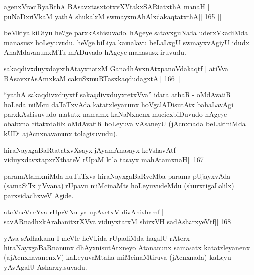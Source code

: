 
\begin{shl}
agenxVraciRyaRthA BAsavxtasxtotxvXVtakxSARtatxthA manaH |
puNaDxriVkaM yathA shukalxM swmayxmAhAlxdakaqtatxthA\hfill || 165 ||
\end{shl}

\begin{artha}
beMkiya kiDiyu heVge parxkAshisuvado, hAgeye satavxguNada uderxVkadiMda manasusx hoLeyuvudu. heVge biLiya kamalavu beLaLxgU swmayxvAgiyU idudx AnaMdavanunxMTu mADuvado hAgeye manasusx iruvudu.
\end{artha}

\begin{shl}
sakaqdivxduyxdayxthA\s tayxnatxM GanadhAvxnAtxpanoVdakaqtf |
atiVva BAsavxrA\s sAmxkaM cakuSxmuRTasxkaqdudagxtA\hfill || 166 ||
\end{shl}

\begin{artha}
``yathA sakaqdivxduyxtf sakaqdivxduyxtetxVva'' idara athaR - oMdAvatiR hoLeda miMcu daTaTxvAda katatxleyanunx hoVgalADisutAtx bahaLavAgi parxkAshisuvudo matutx namamx kaNaNxnenx mucicxbiDuvudo hAgeye obabxna citatxdalilx oMdAvatiR hoLeyuva vAsaneyU (jAcnxnada beLakiniMda kUDi ajAcnxnavanunx tolagisuvudu).
\end{artha}


\begin{shl}
hiraNayxgaBaRtatatxvXsayx jAyamAnasayx keVshavAtf |
viduyxdavxtapxrXthateV rUpaM kila tasayx mahAtamxnaH\hfill || 167 ||
\end{shl}

\begin{artha}
paramAtamxniMda huTuTxva hiraNayxgaBaRveMba parama pUjayxvAda (samaSiTx jiVvana) rUpavu miMcinaMte hoLeyuvudeMdu (shurxtigaLalilx) parxsidadhxveV Agide.
\end{artha}


\begin{shl}
atoV\s neVneYva rUpeVNa ya upAsetxV divAnishamf |
savARnadhxkArahanitxrXVva viduyxtatxM shirxVH sadA\s\s sharxyeVtf\hfill || 168 ||
\end{shl}

\begin{artha}
yAva sAdhakanu I meVle heVLida rUpadiMda hagalU rAterx hiraNayxgaBaRnanunx dhAyxnisutAtxneyo Atananunx samasatx katatxleyanenx (ajAcnxnavanenxV) kaLeyuvaMtaha miMcinaMtiruva (jAcnxnada) kaLeyu yAvAgalU Asharxyisuvadu.
\end{artha}

